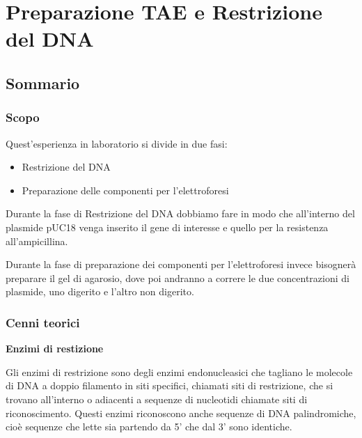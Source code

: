\section{\LARGE{Preparazione TAE e Restrizione del DNA}}

\vspace{0.6cm}


\subsection{Sommario}

\subsubsection{Scopo}

Quest'esperienza in laboratorio si divide in due fasi:

\begin{itemize}

	\item Restrizione del DNA

	\item Preparazione delle componenti per l'elettroforesi

\end{itemize}

Durante la fase di Restrizione del DNA dobbiamo fare in modo che all'interno del
plasmide pUC18 venga inserito il gene di interesse e quello per la resistenza all'ampicillina.
\vspace{0.3cm}

Durante la fase di preparazione dei componenti per l'elettroforesi invece bisognerà preparare il gel di
agarosio, dove poi andranno a correre le due concentrazioni di plasmide, uno digerito e l'altro non digerito.

\subsubsection{Cenni teorici}

\textbf{Enzimi di restizione}
\vspace{0.3cm}



Gli enzimi di restrizione sono degli enzimi endonucleasici che tagliano le molecole
di DNA a doppio filamento in siti specifici, chiamati siti di restrizione,
che si trovano all'interno o adiacenti a sequenze di nucleotidi chiamate siti di riconoscimento.
Questi enzimi riconoscono anche sequenze di DNA palindromiche, cioè sequenze che lette sia
partendo da 5' che dal 3' sono identiche.

